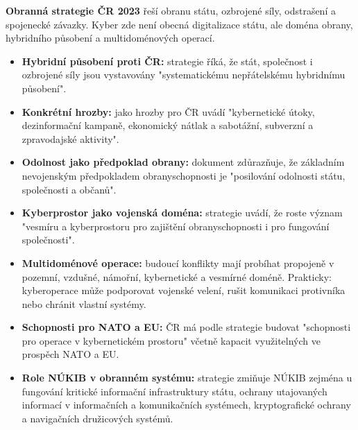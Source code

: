 \textbf{Obranná strategie ČR 2023} řeší obranu státu, ozbrojené síly, odstrašení a spojenecké závazky. Kyber zde není obecná digitalizace státu, ale doména obrany, hybridního působení a multidoménových operací.
\begin{itemize}
  \item \textbf{Hybridní působení proti ČR:} strategie říká, že stát, společnost i ozbrojené síly jsou vystavovány "systematickému nepřátelskému hybridnímu působení".
  \item \textbf{Konkrétní hrozby:} jako hrozby pro ČR uvádí "kybernetické útoky, dezinformační kampaně, ekonomický nátlak a sabotážní, subverzní a zpravodajské aktivity".
  \item \textbf{Odolnost jako předpoklad obrany:} dokument zdůrazňuje, že základním nevojenským předpokladem obranyschopnosti je "posilování odolnosti státu, společnosti a občanů".
  \item \textbf{Kyberprostor jako vojenská doména:} strategie uvádí, že roste význam "vesmíru a kyberprostoru pro zajištění obranyschopnosti i pro fungování společnosti".
  \item \textbf{Multidoménové operace:} budoucí konflikty mají probíhat propojeně v pozemní, vzdušné, námořní, kybernetické a vesmírné doméně. Prakticky: kyberoperace může podporovat vojenské velení, rušit komunikaci protivníka nebo chránit vlastní systémy.
  \item \textbf{Schopnosti pro NATO a EU:} ČR má podle strategie budovat "schopnosti pro operace v kybernetickém prostoru" včetně kapacit využitelných ve prospěch NATO a EU.
  \item \textbf{Role NÚKIB v obranném systému:} strategie zmiňuje NÚKIB zejména u fungování kritické informační infrastruktury státu, ochrany utajovaných informací v informačních a komunikačních systémech, kryptografické ochrany a navigačních družicových systémů.
\end{itemize}

